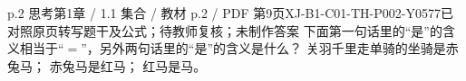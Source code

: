 \par\noindent\begin{minipage}{\linewidth}
\begin{bankitem}{p.2 思考}{第1章 / 1.1 集合 / 教材 p.2 / PDF 第9页}{XJ-B1-C01-TH-P002-Y0577}{已对照原页转写题干及公式；待教师复核；未制作答案}
下面第一句话里的“是”的含义相当于“$=$”，另外两句话里的“是”的含义是什么？
关羽千里走单骑的坐骑是赤兔马；
赤兔马是红马；
红马是马。
\end{bankitem}
\end{minipage}\par\medskip

